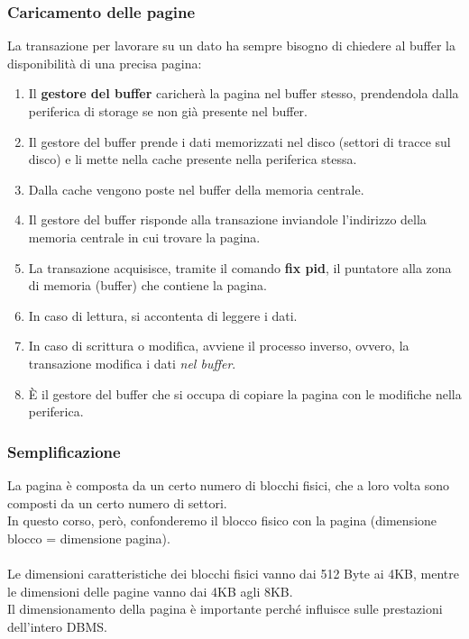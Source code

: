\subsubsection{Caricamento delle pagine}
La transazione per lavorare su un dato ha sempre bisogno di chiedere al buffer la disponibilità di una precisa pagina:
    \begin{enumerate}
        \item{Il \textbf{gestore del buffer} caricherà la pagina nel buffer stesso, prendendola dalla periferica di storage se non già presente nel buffer.}
        \item{Il gestore del buffer prende i dati memorizzati nel disco (settori di tracce sul disco) e li mette nella cache presente nella periferica stessa.}
        \item{Dalla cache vengono poste nel buffer della memoria centrale.}
        \item{Il gestore del buffer risponde alla transazione inviandole l'indirizzo della memoria centrale in cui trovare la pagina.}
        \item{La transazione acquisisce, tramite il comando \textbf{fix pid}, il puntatore alla zona di memoria (buffer) che contiene la pagina.}
        \item{In caso di lettura, si accontenta di leggere i dati.}
        \item{In caso di scrittura o modifica, avviene il processo inverso, ovvero, la transazione modifica i dati \textit{nel buffer}.}
        \item{È il gestore del buffer che si occupa di copiare la pagina con le modifiche nella periferica.}
    \end{enumerate}

\subsubsection{Semplificazione}
La pagina è composta da un certo numero di blocchi fisici, che a loro volta sono composti da un certo numero di settori.\\
In questo corso, però, confonderemo il blocco fisico con la pagina (dimensione blocco = dimensione pagina).\\\\
Le dimensioni caratteristiche dei blocchi fisici vanno dai 512 Byte ai 4KB, mentre le dimensioni delle pagine vanno dai 4KB agli 8KB.\\
Il dimensionamento della pagina è importante perché influisce sulle prestazioni dell'intero DBMS.

